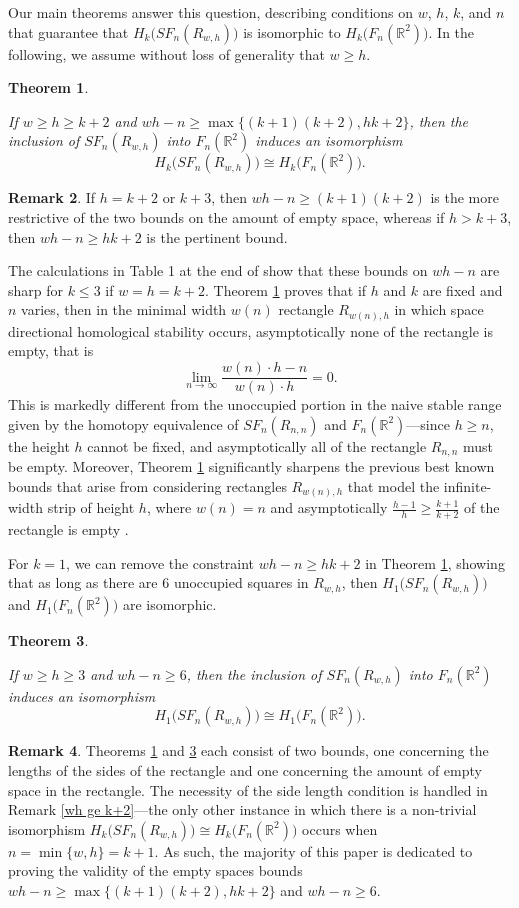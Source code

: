 \documentclass[pagebackref,colorlinks,citecolor=blue,linkcolor=blue,urlcolor=blue,filecolor=blue]{article}
\newtheorem{thm}{Theorem}[section]
\theoremstyle{definition}\newtheorem{definition}[thm]{Definition}
\theoremstyle{definition}
\newtheorem{remark}[thm]{Remark}
\newcommand{\thmtext}{
If $w\ge h\ge k+2$ and $wh-n\ge \max\big\{(k+1)(k+2), hk+2\big\}$, then the inclusion of $SF_{n}(R_{w,h})$ into $F_{n}(\R^{2})$
induces an isomorphism
\[
H_{k}\big(SF_{n}(R_{w,h})\big)\cong H_{k}\big(F_{n}(\R^{2})\big).
\]
}
\newcommand{\thmtextone}{
If $w\ge h \ge 3$ and $wh-n\ge 6$, then the inclusion of $SF_{n}(R_{w,h})$ into $F_{n}(\R^{2})$ induces an isomorphism
\[
H_{1}\big(SF_{n}(R_{w,h})\big)\cong H_{1}\big(F_{n}(\R^{2})\big).
\]
}
\newcommand{\R}{\ensuremath{\mathbb{R}}}
\begin{document}
Our main theorems answer this question, describing conditions on $w$, $h$, $k$, and $n$ that guarantee that $H_{k}\big(SF_{n}(R_{w,h})\big)$ is isomorphic to $H_{k}\big(F_{n}(\R^{2})\big)$.
In the following, we assume without loss of generality that $w\ge h$.

\begin{thm}\label{space homological stability}
\thmtext
\end{thm}

\begin{remark}
If $h=k+2$ or $k+3$, then $wh-n\ge (k+1)(k+2)$ is the more restrictive of the two bounds on the amount of empty space, whereas if $h>k+3$, then $wh-n \ge hk+2$ is the pertinent bound.  
\end{remark}

The calculations in Table 1 at the end of \cite{alpert2023homology} show that these bounds on $wh-n$ are sharp for $k\le 3$ if $w=h=k+2$.
Theorem \ref{space homological stability} proves that if $h$ and $k$ are fixed and $n$ varies, then in the minimal width $w(n)$ rectangle $R_{w(n),h}$ in which space directional homological stability occurs, asymptotically none of the rectangle is empty, that is
\[
\lim_{n\to \infty}\frac{w(n)\cdot h-n}{w(n)\cdot h}=0.
\]
This is markedly different from the unoccupied portion in the naive stable range given by the homotopy equivalence of $SF_{n}(R_{n,n})$ and $F_{n}(\R^{2})$---since $h\ge n$, the height $h$ cannot be fixed, and asymptotically all of the rectangle $R_{n,n}$ must be empty.
Moreover, Theorem \ref{space homological stability} significantly sharpens the previous best known bounds that arise from considering rectangles $R_{w(n),h}$ that model the infinite-width strip of height $h$, where $w(n)=n$ and asymptotically $\frac{h-1}{h}\ge \frac{k+1}{k+2}$ of the rectangle is empty \cite[Theorem 1.2]{alpert2021configuration}.

For $k=1$, we can remove the constraint $wh-n\ge hk+2$ in Theorem \ref{space homological stability}, showing that as long as there are $6$ unoccupied squares in $R_{w,h}$, then $H_{1}\big(SF_{n}(R_{w,h})\big)$ and $ H_{1}\big(F_{n}(\R^{2})\big)$ are isomorphic.

\begin{thm}\label{almost sharp homological stability for k=1}
\thmtextone
\end{thm}

\begin{remark}
Theorems \ref{space homological stability} and \ref{almost sharp homological stability for k=1} each consist of two bounds, one concerning the lengths of the sides of the rectangle and one concerning the amount of empty space in the rectangle.
The necessity of the side length condition is handled in Remark \ref{wh ge k+2}---the only other instance in which there is a non-trivial isomorphism $H_{k}\big(SF_{n}(R_{w,h})\big)\cong H_{k}\big(F_{n}(\R^{2})\big)$ occurs when $n=\min\{w,h\}=k+1$.
As such, the majority of this paper is dedicated to proving the validity of the empty spaces bounds $wh-n\ge \max\big\{(k+1)(k+2), hk+2\big\}$ and $wh-n\ge 6$.
\end{remark}
\end{document}
